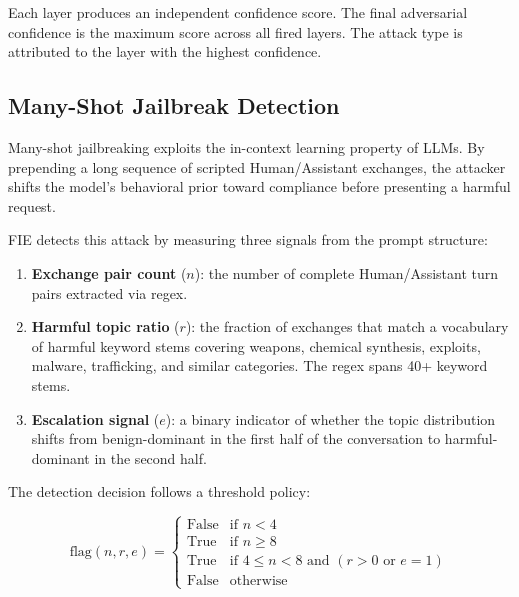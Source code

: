 \documentclass[preprint,12pt,authoryear]{elsarticle}
\begin{document}
Each layer produces an independent confidence score. The final
adversarial confidence is the maximum score across all fired layers.
The attack type is attributed to the layer with the highest confidence.

\subsection{Many-Shot Jailbreak Detection}
\label{subsec:manyshot}

Many-shot jailbreaking \citep{anil2024manyshot} exploits the in-context
learning property of LLMs. By prepending a long sequence of scripted
Human/Assistant exchanges, the attacker shifts the model's behavioral
prior toward compliance before presenting a harmful request.

FIE detects this attack by measuring three signals from the prompt
structure:

\begin{enumerate}
  \item \textbf{Exchange pair count} ($n$): the number of complete
        Human/Assistant turn pairs extracted via regex.

  \item \textbf{Harmful topic ratio} ($r$): the fraction of exchanges
        that match a vocabulary of harmful keyword stems covering
        weapons, chemical synthesis, exploits, malware, trafficking,
        and similar categories. The regex spans 40+ keyword stems.

  \item \textbf{Escalation signal} ($e$): a binary indicator of
        whether the topic distribution shifts from benign-dominant in
        the first half of the conversation to harmful-dominant in the
        second half.
\end{enumerate}

The detection decision follows a threshold policy:

\begin{equation}
\text{flag}(n, r, e) =
\begin{cases}
\text{False} & \text{if } n < 4 \\
\text{True}  & \text{if } n \geq 8 \\
\text{True}  & \text{if } 4 \leq n < 8 \text{ and } (r > 0 \text{ or } e = 1) \\
\text{False} & \text{otherwise}
\end{cases}
\end{equation}
\end{document}
